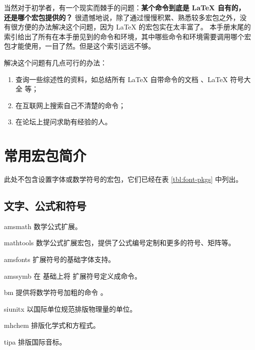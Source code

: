 当然对于初学者，有一个现实而棘手的问题：\textbf{某个命令到底是 \LaTeX{} 自有的，还是哪个宏包提供的？}
很遗憾地说，除了通过慢慢积累、熟悉较多宏包之外，没有很方便的办法解决这个问题，因为 \LaTeX{} 的宏包实在太丰富了。
本手册末尾的索引给出了所有在本手册见到的命令和环境，其中哪些命令和环境需要调用哪个宏包才能使用，一目了然。但是这个索引远远不够。

解决这个问题有几点可行的办法：
\begin{enumerate}
  \item 查询一些综述性的资料，如总结所有 \LaTeX{} 自带命令的文档 \cite{latex2e}、\LaTeX{} 符号大全 \cite{symbols} 等；
  \item 在互联网上搜索自己不清楚的命令；
  \item 在论坛上提问求助有经验的人。
\end{enumerate}

\section{常用宏包简介}\label{sec:pkg-list}

\def\pkglabel#1{\makebox[60pt][l]{\pkg{#1}}}
\newenvironment{pkglist}%
  {\list{}{%
    \labelwidth=60pt
    \itemindent=0pt
    \leftmargin=60pt
    \labelsep=0pt
    \let\makelabel\pkglabel}}%
  {\endlist}

此处不包含设置字体或数学符号的宏包，它们已经在表 \ref{tbl:font-pkgs} 中列出。

\subsection{文字、公式和符号}\label{subsec:text-math-symbols}

\begin{pkglist}
  \item[amsmath]  \AmS{} 数学公式扩展。
  \item[mathtools] 数学公式扩展宏包，提供了公式编号定制和更多的符号、矩阵等。
  \item[amsfonts] \AmS{} 扩展符号的基础字体支持。
  \item[amssymb]  在  基础上将 \AmS{} 扩展符号定义成命令。
  \item[bm]       提供将数学符号加粗的命令 。
  \item[siunitx]  以国际单位规范排版物理量的单位。
  \item[mhchem]   排版化学式和方程式。
  \item[tipa]     排版国际音标。
\end{pkglist}


